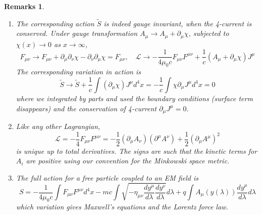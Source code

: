 \documentclass[a4paper]{article}
\newtheorem{remarks}{Remarks}[section]
\theoremstyle{new}
\begin{document}
\begin{remarks}\leavevmode
\begin{enumerate}
\item The corresponding action $\tilde{S}$ is indeed gauge invariant, when the 4-current is conserved. Under gauge transformation $A_\mu\rightarrow A_\mu+\partial_\mu\chi$, subjected to $\chi(x)\rightarrow0$ as $x\rightarrow\infty$,
$$F_{\mu\nu}\rightarrow F_{\mu\nu}+\partial_\mu\partial_\nu\chi-\partial_\nu\partial_\mu\chi=F_{\mu\nu},\quad\mathcal{L}\rightarrow-\frac{1}{4\mu_0c}F_{\mu\nu}F^{\mu\nu}+\frac{1}{c}(A_\mu+\partial_\mu\chi)J^\mu$$
The corresponding variation in action is
$$\tilde{S}\rightarrow\tilde{S}+\frac{1}{c}\int(\partial_\mu\chi)J^\mu d^4x=-\frac{1}{c}\int\chi\partial_\mu J^\mu d^4x=0$$
where we integrated by parts and used the boundary conditions (surface term disappears) and the conservation of 4-current $\partial_\mu J^\mu=0$.
\item Like any other Lagrangian,
$$\mathcal{L}=-\frac{1}{4}F_{\mu\nu}F^{\mu\nu}=-\frac{1}{2}(\partial_\mu A_\nu)(\partial^\mu A^\nu)+\frac{1}{2}(\partial_\mu A^\mu)^2$$
is unique up to total derivatives. The signs are such that the kinetic terms for $A_i$ are positive using our convention for the Minkowski space metric.
\item The full action for a free particle coupled to an EM field is  
$$S=-\frac{1}{4\mu_0c}\int F_{\mu\nu}F^{\mu\nu}d^4x-mc\int\sqrt{-\eta_{\mu\nu}\frac{dy^\mu}{d\lambda}\frac{dy^\nu}{d\lambda}}d\lambda+q\int A_\mu(y(\lambda))\frac{dy^\mu}{d\lambda}d\lambda$$
which variation gives Maxwell's equations and the Lorentz force law.
\end{enumerate}
\end{remarks}
\newpage
\end{document}
